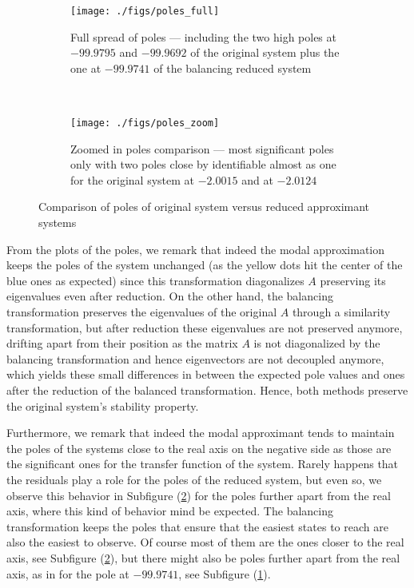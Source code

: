 \documentclass[10pt,a4paper]{article}
\begin{document}
\begin{figure}
\centering
\begin{subfigure}{.5\textwidth}
  \centering
  \texttt{[image: ./figs/poles\_full]}
  \caption{Full spread of poles --- including the two high poles at $-99.9795$ and $-99.9692$ of the original system plus the one at $-99.9741$ of the balancing reduced system}\label{fig:poles_full}
\end{subfigure}%
~
\begin{subfigure}{.5\textwidth}
  \centering
  \texttt{[image: ./figs/poles\_zoom]}
  \caption{Zoomed in poles comparison --- most significant poles only with two poles close by identifiable almost as one for the original system at $-2.0015$ and at $-2.0124$}\label{fig:poles_zoom}
\end{subfigure}
\caption{Comparison of poles of original system versus reduced approximant systems}\label{fig:poles}
\end{figure}

From the plots of the poles, we remark that indeed the modal approximation keeps the poles of the system unchanged (as the yellow dots hit the center of the blue ones as expected) since this transformation diagonalizes $A$ preserving its eigenvalues even after reduction. On the other hand, the balancing transformation preserves the eigenvalues of the original $A$ through a similarity transformation, but after reduction these eigenvalues are not preserved anymore, drifting apart from their position as the matrix $A$ is not diagonalized by the balancing transformation and hence eigenvectors are not decoupled anymore, which yields these small differences in between the expected pole values and ones after the reduction of the balanced transformation. Hence, both methods preserve the original system's stability property.

Furthermore, we remark that indeed the modal approximant tends to maintain the poles of the systems close to the real axis on the negative side as those are the significant ones for the transfer function of the system. Rarely happens that the residuals play a role for the poles of the reduced system, but even so, we observe this behavior in Subfigure (\ref{fig:poles_zoom}) for the poles further apart from the real axis, where this kind of behavior mind be expected. The balancing transformation keeps the poles that ensure that the easiest states to reach are also the easiest to observe. Of course most of them are the ones closer to the real axis, see Subfigure (\ref{fig:poles_zoom}), but there might also be poles further apart from the real axis, as in for the pole at $-99.9741$, see Subfigure (\ref{fig:poles_full}).
\end{document}
